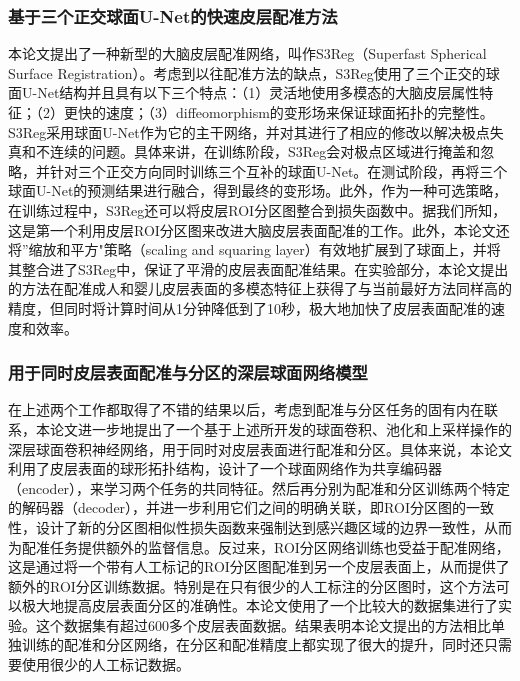 \subsubsection{基于三个正交球面U-Net的快速皮层配准方法}
本论文提出了一种新型的大脑皮层配准网络，叫作S3Reg（Superfast Spherical Surface Registration）。考虑到以往配准方法的缺点，S3Reg使用了三个正交的球面U-Net结构并且具有以下三个特点：（1）灵活地使用多模态的大脑皮层属性特征；（2）更快的速度；（3）diffeomorphism的变形场来保证球面拓扑的完整性。S3Reg采用球面U-Net作为它的主干网络，并对其进行了相应的修改以解决极点失真和不连续的问题。具体来讲，在训练阶段，S3Reg会对极点区域进行掩盖和忽略，并针对三个正交方向同时训练三个互补的球面U-Net。在测试阶段，再将三个球面U-Net的预测结果进行融合，得到最终的变形场。此外，作为一种可选策略，在训练过程中，S3Reg还可以将皮层ROI分区图整合到损失函数中。据我们所知，这是第一个利用皮层ROI分区图来改进大脑皮层表面配准的工作。此外，本论文还将”缩放和平方"策略（scaling and squaring layer）有效地扩展到了球面上，并将其整合进了S3Reg中，保证了平滑的皮层表面配准结果。在实验部分，本论文提出的方法在配准成人和婴儿皮层表面的多模态特征上获得了与当前最好方法同样高的精度，但同时将计算时间从1分钟降低到了10秒，极大地加快了皮层表面配准的速度和效率。

\subsubsection{用于同时皮层表面配准与分区的深层球面网络模型}
在上述两个工作都取得了不错的结果以后，考虑到配准与分区任务的固有内在联系，本论文进一步地提出了一个基于上述所开发的球面卷积、池化和上采样操作的深层球面卷积神经网络，用于同时对皮层表面进行配准和分区。具体来说，本论文利用了皮层表面的球形拓扑结构，设计了一个球面网络作为共享编码器（encoder），来学习两个任务的共同特征。然后再分别为配准和分区训练两个特定的解码器（decoder），并进一步利用它们之间的明确关联，即ROI分区图的一致性，设计了新的分区图相似性损失函数来强制达到感兴趣区域的边界一致性，从而为配准任务提供额外的监督信息。反过来，ROI分区网络训练也受益于配准网络，这是通过将一个带有人工标记的ROI分区图配准到另一个皮层表面上，从而提供了额外的ROI分区训练数据。特别是在只有很少的人工标注的分区图时，这个方法可以极大地提高皮层表面分区的准确性。本论文使用了一个比较大的数据集进行了实验。这个数据集有超过600多个皮层表面数据。结果表明本论文提出的方法相比单独训练的配准和分区网络，在分区和配准精度上都实现了很大的提升，同时还只需要使用很少的人工标记数据。

